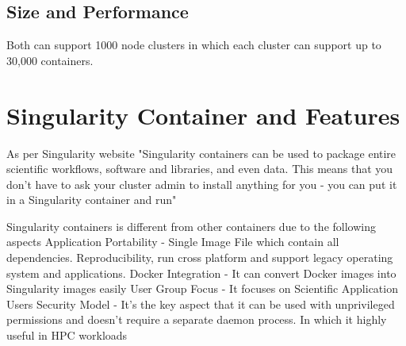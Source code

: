 \documentclass[sigconf]{acmart}
\begin{document}
\subsection{Size and Performance}
Both can support 1000 node clusters in which each cluster can support up to 30,000 containers.

\section {Singularity Container and Features}
As per Singularity website "Singularity containers can be used to package entire scientific workflows, software and libraries, and even data. This means that you don't have to ask your cluster admin to install anything for you - you can put it in a Singularity container and run"

Singularity containers is different from other containers due to the following aspects
Application Portability - Single Image File which contain all dependencies. Reproducibility, run cross platform and support legacy operating system and applications.
Docker Integration - It can convert Docker images into Singularity images easily
User Group Focus - It focuses on Scientific Application Users
Security Model - It's the key aspect that it can be used with unprivileged permissions and doesn't require a separate daemon process. In which it highly useful in HPC workloads
\cite{}

 
\end{document}
